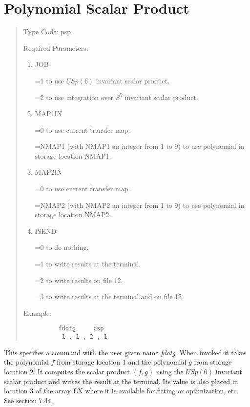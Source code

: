 \newpage
\section{Polynomial Scalar Product}  
\begin{quotation}
\noindent Type Code:  psp
\vspace{5mm}

\noindent Required Parameters:
\begin{enumerate}
\item  JOB

       =1 to use $USp(6)$ invariant scalar product.

	   =2 to use integration over $S^5$ invariant scalar product.

\item  MAP1IN

       =0 to use current transfer map.

       =NMAP1 (with NMAP1 an integer from 1 to 9) to use polynomial in storage \hspace*{1em}location NMAP1.

\item  MAP2IN

       =0 to use current transfer map.

       =NMAP2 (with NMAP2 an integer from 1 to 9) to use polynomial in storage \hspace*{1em}location NMAP2.

\item ISEND

      =0 to do nothing.

      =1 to write results at the terminal.

      =2 to write results on file 12.

      =3 to write results at the terminal and on file 12.
\end{enumerate}

\vspace{5mm}
\noindent Example:
\begin{verbatim}
          fdotg     psp
           1 , 1 , 2 , 1
\end{verbatim}
\end{quotation}
This specifies a command with the user given name {\em fdotg}.  When invoked it takes the polynomial $f$ from storage location 1 and the polynomial $g$ from storage location 2.  It computes the scalar product $(f,g)$ using the $USp(6)$ invariant scalar product and writes the result at the terminal.  Its value is also placed in location 3 of the array EX where it is available for fitting or optimization, etc.   See section 7.44.

